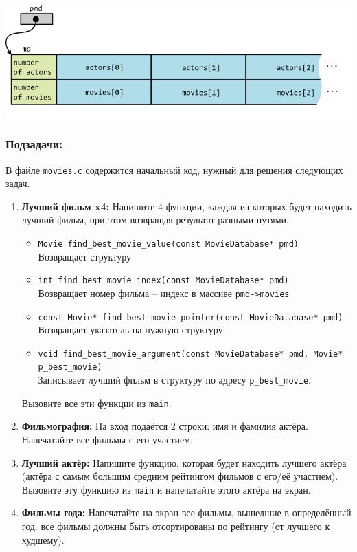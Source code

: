 \documentclass{article}
\begin{document}
\begin{center}
\includegraphics[scale=0.8]{../images/movie_database_structure.png}
\end{center}

\subsubsection*{Подзадачи:}
В файле \texttt{movies.c} содержится начальный код, нужный для решения следующих задач.
\begin{enumerate}
\item \textbf{Лучший фильм x4:} Напишите 4 функции, каждая из которых будет находить лучший фильм, при этом возвращая  результат разными путями. 
\begin{itemize}
\item \texttt{Movie find\_best\_movie\_value(const MovieDatabase* pmd)}\\
Возвращает структуру
\item \texttt{int find\_best\_movie\_index(const MovieDatabase* pmd)} \\
Возвращает номер фильма -- индекс в массиве \texttt{pmd->movies}
\item \texttt{const Movie* find\_best\_movie\_pointer(const MovieDatabase* pmd)}\\
Возвращает указатель на нужную структуру
\item \texttt{void find\_best\_movie\_argument(const MovieDatabase* pmd, Movie* p\_best\_movie)}\\
Записывает лучший фильм в структуру по адресу \texttt{p\_best\_movie}.
\end{itemize}
Вызовите все эти функции из \texttt{main}.
\item \textbf{Фильмография:} На вход подаётся 2 строки: имя и фамилия актёра. Напечатайте все фильмы с его участием.
\item \textbf{Лучший актёр:} Напишите функцию, которая будет находить лучшего актёра (актёра с самым большим средним рейтингом фильмов с его/её участием). Вызовите эту функцию из \texttt{main} и напечатайте этого актёра на экран.
\item \textbf{Фильмы года:} Напечатайте на экран все фильмы, вышедшие в определённый год. все фильмы должны быть отсортированы по рейтингу (от лучшего к худшему).
\end{enumerate}
\end{document}
